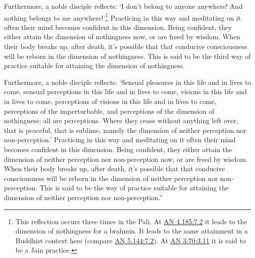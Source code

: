 \documentclass[12pt,openany]{book}%
\begin{document}
Furthermore, a noble disciple reflects: ‘I don’t belong to anyone anywhere! And nothing belongs to me anywhere!’\footnote{This reflection occurs three times in the Pali. At \href{https://suttacentral.net/an4.185/en/sujato\#7.2}{AN 4.185:7.2} it leads to the dimension of nothingness for a brahmin. It leads to the same attainment in a Buddhist context here (compare \href{https://suttacentral.net/an5.144/en/sujato\#7.2}{AN 5.144:7.2}). At \href{https://suttacentral.net/an3.70/en/sujato\#3.11}{AN 3.70:3.11} it is said to be a Jain practice. } Practicing in this way and meditating on it often their mind becomes confident in this dimension. Being confident, they either attain the dimension of nothingness now, or are freed by wisdom. When their body breaks up, after death, it’s possible that that conducive consciousness will be reborn in the dimension of nothingness. This is said to be the third way of practice suitable for attaining the dimension of nothingness. 

Furthermore, a noble disciple reflects: ‘Sensual pleasures in this life and in lives to come, sensual perceptions in this life and in lives to come, visions in this life and in lives to come, perceptions of visions in this life and in lives to come, perceptions of the imperturbable, and perceptions of the dimension of nothingness; all are perceptions. Where they cease without anything left over, that is peaceful, that is sublime, namely the dimension of neither perception nor non-perception.’ Practicing in this way and meditating on it often their mind becomes confident in this dimension. Being confident, they either attain the dimension of neither perception nor non-perception now, or are freed by wisdom. When their body breaks up, after death, it’s possible that that conducive consciousness will be reborn in the dimension of neither perception nor non-perception. This is said to be the way of practice suitable for attaining the dimension of neither perception nor non-perception.” 
\end{document}
